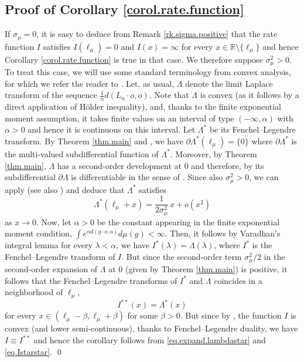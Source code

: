 \documentclass[JEP,XML,SOM,Unicode,published]{cedram}
\theoremstyle{plain}
\theoremstyle{definition}
\newcommand\R{\mathbb{R}}
\begin{document}
\subsection{Proof of Corollary \ref{corol.rate.function}}\label{subsec.corol}
If $\sigma_\mu=0$, it is easy to deduce from Remark \ref{rk.sigma.positive} that the rate function $I$ satisfies $I(\ell_\mu)=0$ and $I(x)=\infty$ for every $x \in \R \setminus \{\ell_\mu\}$ and hence Corollary \ref{corol.rate.function} is true in that case. We therefore suppose $\sigma^2_\mu>0$. To treat this case, we will use some standard terminology from convex analysis, for which we refer the reader to \cite{convexity.book}. Let, as usual, $\Lambda$ denote the limit Laplace transform of the sequence $\frac{1}{n} d(L_n \cdot o,o)$. Note that $\Lambda$ is convex (as it follows by a direct application of Hölder inequality), and, thanks to the finite exponential moment assumption, it takes finite values on an interval of type $(-\infty,\alpha)$ with $\alpha>0$ and hence it is continuous on this interval. Let $\Lambda^\ast$ be its Fenchel--Legendre transform. By Theorem \ref{thm.main} and \cite[Prop.\,6.1.2]{convexity.book}, we have $\partial \Lambda^\ast(\ell_\mu)=\{0\}$ where $\partial \Lambda^\ast$ is the multi-valued subdifferential function of $\Lambda^{\ast}$. Moreover, by Theorem \ref{thm.main}, $\Lambda$ has a second-order development at $0$ and therefore, by \cite[Th.\,5.1.2]{convexity.book} its subdifferential $\partial \Lambda$ is differentiable in the sense of \cite[Def.\,5.1.1]{convexity.book}. Since also $\sigma_\mu^2>0$, we can apply \cite[Prop.\,6.2.5]{convexity.book} (see also \cite[Prop.\,4.5]{gianluca}) and deduce that $\Lambda^\ast$ satisfies
\begin{equation}\label{eq.expand.lambdastar}
\Lambda^{\ast}(\ell_\mu+ x)=\frac{1}{2\sigma_\mu^2}\,x + o(x^2)
\end{equation}
as $x \to 0$.
Now, let $\alpha>0$ be the constant appearing in the finite exponential moment condition, \ie $\int e^{\alpha d(g \cdot o,o)} d\mu(g)<\infty$.
Then, it follows by Varadhan's integral lemma \cite[Th.\,4.3.1]{dembo-zeitouni} for every $\lambda<\alpha$, we have $I^\ast(\lambda)=\Lambda(\lambda)$, where $I^\ast$ is the Fenchel--Legendre transform of $I$. But since the second-order term $\sigma^2_\mu/2$ in the second-order expansion of $\Lambda$ at $0$ (given by Theorem \ref{thm.main}) is positive, it follows that the Fenchel--Legendre transforms of $I^\ast$ and $\Lambda$ coincides in a neighborhood of $\ell_\mu$, \ie
\begin{equation}\label{eq.Istarstar}
I^{\ast \ast}(x)=\Lambda^{\ast}(x)
\end{equation}
for every $x \in (\ell_\mu-\beta,\ell_\mu+\beta)$ for some $\beta>0$. But since by \cite[Th.\,1.1]{BMSS}, the function $I$ is convex (and lower semi-continuous), thanks to Fenchel--Legendre duality, we have $I \equiv I^{\ast \ast}$ and hence the corollary follows from \eqref{eq.expand.lambdastar} and \eqref{eq.Istarstar}. \qed
\end{document}
